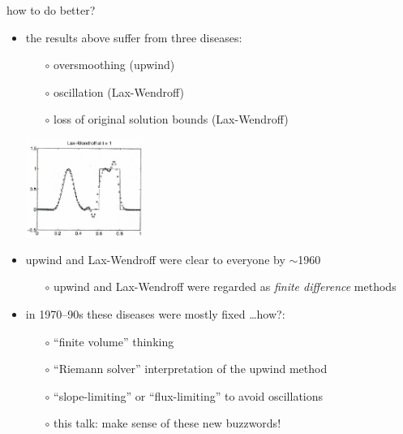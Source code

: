 \documentclass[10pt,hyperref]{beamer}
\begin{document}
\begin{frame}{how to do better?}

\begin{itemize}
\item the results above suffer from three diseases:
    \begin{itemize}
    \item[$\circ$] \alert{oversmoothing} (upwind)
    \item[$\circ$] \alert{oscillation} (Lax-Wendroff)
    \item[$\circ$] \alert{loss of original solution bounds} (Lax-Wendroff)
    \end{itemize}

\vspace{-15mm}

\hfill \includegraphics[width=0.3\textwidth]{figs/leveque6p1lw}

\bigskip
\item upwind and Lax-Wendroff were clear to everyone by $\sim$1960
    \begin{itemize}
    \item[$\circ$] upwind and Lax-Wendroff were regarded as \emph{finite difference} methods
    \end{itemize}
\item in 1970--90s these diseases were mostly fixed \dots how?:
    \begin{itemize}
    \item[$\circ$] ``finite volume'' thinking
    \item[$\circ$] ``Riemann solver'' interpretation of the upwind method
    \item[$\circ$] ``slope-limiting'' or ``flux-limiting'' to avoid oscillations
    \item[$\circ$] this talk: make sense of these new buzzwords!
    \end{itemize}
\end{itemize}
\end{frame}


\newcommand{\xiphalf}{{x_{i+\frac{1}{2}}}}
\newcommand{\ximhalf}{{x_{i-\frac{1}{2}}}}
\newcommand{\Fiphalfn}{{F^n_{i+\frac{1}{2}}}}
\newcommand{\Fimhalfn}{{F^n_{i-\frac{1}{2}}}}
\end{document}
